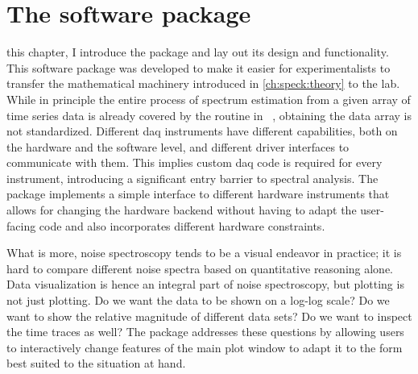 \chapter{The \pyspeck software package}\label{ch:speck:software}
 this chapter, I introduce the \pyspeck \python package
and lay out its design and functionality.
This software package was developed to make it easier for experimentalists to transfer the mathematical machinery introduced in \cref{ch:speck:theory} to the lab.
While in principle the entire process of spectrum estimation from a given array of time series data is already covered by the  routine in \scipy~, obtaining the data array is not standardized.
Different \gls{daq} instruments have different capabilities, both on the hardware and the software level, and different driver interfaces to communicate with them.
This implies custom \acrlong{daq} code is required for every instrument, introducing a significant entry barrier to spectral analysis.
The \pyspeck package implements a simple interface to different hardware instruments that allows for changing the hardware backend without having to adapt the user-facing code and also incorporates different hardware constraints.

What is more, noise spectroscopy tends to be a visual endeavor in practice; it is hard to compare different noise spectra based on quantitative reasoning alone.
Data visualization is hence an integral part of noise spectroscopy, but plotting is not just plotting.
Do we want the data to be shown on a log-log scale?
Do we want to show the relative magnitude of different data sets?
Do we want to inspect the time traces as well?
The \pyspeck package addresses these questions by allowing users to interactively change features of the main plot window to adapt it to the form best suited to the situation at hand.

